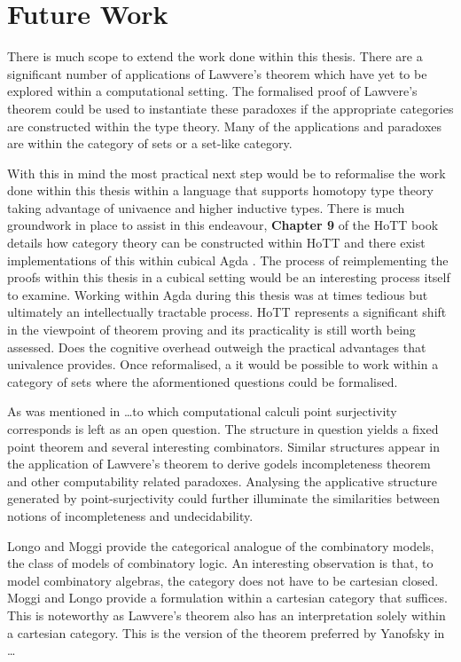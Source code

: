 \section{Future Work}
There is much scope to extend the work done within this thesis. There are a
significant number of applications of Lawvere's theorem which have yet to be
explored within a computational setting. The formalised proof of Lawvere's
theorem could be used to instantiate these paradoxes if the appropriate
categories are constructed within the type theory. Many of the applications and
paradoxes are within the category of sets or a set-like category.



With this in mind the most practical next step would be to reformalise the work
done within this thesis within a language that supports homotopy type theory
taking advantage of univaence and higher inductive types. There is much
groundwork in place to assist in this endeavour, \textbf{Chapter 9} of
the HoTT book details how category theory can be constructed within HoTT and
there exist implementations of this within cubical Agda . The
process of reimplementing the proofs within this thesis in a cubical setting
would be an interesting process itself to examine. Working within Agda during
this thesis was at times tedious but ultimately an intellectually tractable
process. HoTT represents a significant shift in the viewpoint of theorem proving
and its practicality is still worth being assessed. Does the cognitive overhead
outweigh the practical advantages that univalence provides. Once reformalised, a
it would be possible to work within a category of sets where the aformentioned
questions could be formalised.


As was mentioned in \ldots to which computational calculi point surjectivity
corresponds is left as an open question. The structure in question yields a
fixed point theorem and several interesting combinators. Similar structures
appear in the application of Lawvere's theorem to derive godels incompleteness
theorem and other computability related paradoxes. Analysing the applicative
structure generated by point-surjectivity could further illuminate the
similarities between notions of incompleteness and undecidability.


Longo and Moggi provide the categorical analogue of the combinatory models, the
class of models of combinatory logic. An interesting observation is that, to
model combinatory algebras, the category does not have to be cartesian closed.
Moggi and Longo provide a formulation within a cartesian category that suffices.
This is noteworthy as Lawvere's theorem also has an interpretation solely within
a cartesian category. This is the version of the theorem preferred by Yanofsky
in \ldots
